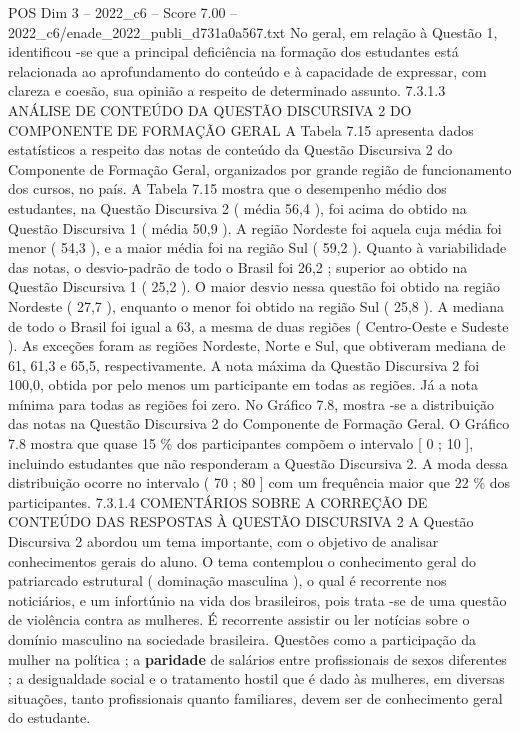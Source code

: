 \begin{textsample}{POS Dim 3 – 2022\_c6 – Score 7.00 – 2022\_c6/enade\_2022\_publi\_d731a0a567.txt}
No geral, em relação à Questão 1, identificou -se que a principal deficiência na formação dos estudantes está relacionada ao aprofundamento do conteúdo e à capacidade de expressar, com clareza e coesão, sua opinião a respeito de determinado assunto. 7.3.1.3 ANÁLISE DE CONTEÚDO DA QUESTÃO DISCURSIVA 2 DO COMPONENTE DE FORMAÇÃO GERAL A Tabela 7.15 apresenta dados estatísticos a respeito das notas de conteúdo da Questão Discursiva 2 do Componente de Formação Geral, organizados por grande região de funcionamento dos cursos, no país.
A Tabela 7.15 mostra que o desempenho médio dos estudantes, na Questão Discursiva 2 ( média 56,4 ), foi acima do obtido na Questão Discursiva 1 ( média 50,9 ).
A região Nordeste foi aquela cuja média foi menor ( 54,3 ), e a maior média foi na região Sul ( 59,2 ).
Quanto à variabilidade das notas, o desvio-padrão de todo o Brasil foi 26,2 ; superior ao obtido na Questão Discursiva 1 ( 25,2 ).
O maior desvio nessa questão foi obtido na região Nordeste ( 27,7 ), enquanto o menor foi obtido na região Sul ( 25,8 ).
A mediana de todo o Brasil foi igual a 63, a mesma de duas regiões ( Centro-Oeste e Sudeste ).
As exceções foram as regiões Nordeste, Norte e Sul, que obtiveram mediana de 61, 61,3 e 65,5, respectivamente.
A nota máxima da Questão Discursiva 2 foi 100,0, obtida por pelo menos um participante em todas as regiões.
Já a nota mínima para todas as regiões foi zero.
No Gráfico 7.8, mostra -se a distribuição das notas na Questão Discursiva 2 do Componente de Formação Geral.
O Gráfico 7.8 mostra que quase 15 \% dos participantes compõem o intervalo [ 0 ; 10 ], incluindo estudantes que não responderam a Questão Discursiva 2.
A moda dessa distribuição ocorre no intervalo ( 70 ; 80 ] com um frequência maior que 22 \% dos participantes. 7.3.1.4 COMENTÁRIOS SOBRE A CORREÇÃO DE CONTEÚDO DAS RESPOSTAS À QUESTÃO DISCURSIVA 2 A Questão Discursiva 2 abordou um tema importante, com o objetivo de analisar conhecimentos gerais do aluno.
O tema contemplou o conhecimento geral do patriarcado estrutural ( dominação masculina ), o qual é recorrente nos noticiários, e um infortúnio na vida dos brasileiros, pois trata -se de uma questão de violência contra as mulheres.
É recorrente assistir ou ler notícias sobre o domínio masculino na sociedade brasileira.
Questões como a participação da mulher na política ; a \textbf{paridade} de salários entre profissionais de sexos diferentes ; a desigualdade social e o tratamento hostil que é dado às mulheres, em diversas situações, tanto profissionais quanto familiares, devem ser de conhecimento geral do estudante.

\end{textsample}
